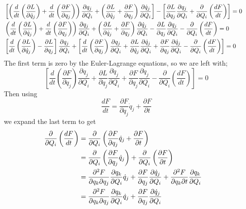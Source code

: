 \documentclass{article}
\begin{document}
\begin{align}
    &\left[ \left(\frac{d}{dt} \left( \frac{\partial L}{\partial \dot{q}_j} \right) + \frac{d}{dt} \left( \frac{\partial F}{\partial q_j} \right)\right) \frac{\partial q_j}{\partial Q_i} + \left(\frac{\partial L}{\partial \dot{q}_j} + \frac{\partial F}{\partial q_j}\right) \frac{\partial \dot{q}_j}{\partial Q_i} \right] - \left[ \frac{\partial L}{\partial q_j} \frac{\partial q_j}{\partial Q_i} + \frac{\partial}{\partial Q_i} \left( \frac{dF}{dt} \right) \right] = 0 \cr
    &\left(\frac{d}{dt} \left( \frac{\partial L}{\partial \dot{q}_j} \right) + \frac{d}{dt} \left( \frac{\partial F}{\partial q_j} \right)\right) \frac{\partial q_j}{\partial Q_i} + \left(\frac{\partial L}{\partial \dot{q}_j} + \frac{\partial F}{\partial q_j}\right) \frac{\partial \dot{q}_j}{\partial Q_i} - \frac{\partial L}{\partial q_j} \frac{\partial q_j}{\partial Q_i} - \frac{\partial}{\partial Q_i} \left( \frac{dF}{dt} \right) = 0 \cr
    &\left[ \frac{d}{dt} \left( \frac{\partial L}{\partial \dot{q}_j} \right) - \frac{\partial L}{\partial q_j} \right] \frac{\partial q_j}{\partial Q_i} + \left[ \frac{d}{dt} \left( \frac{\partial F}{\partial q_j} \right) \frac{\partial q_j}{\partial Q_i} + \frac{\partial L}{\partial \dot{q}_j} \frac{\partial \dot{q}_j}{\partial Q_i} + \frac{\partial F}{\partial q_j} \frac{\partial \dot{q}_j}{\partial Q_i} - \frac{\partial}{\partial Q_i} \left( \frac{dF}{dt} \right) \right] = 0
\end{align}
The first term is zero by the Euler-Lagrange equations, so we are left with;
\begin{equation}
	\left[ \frac{d}{dt} \left( \frac{\partial F}{\partial q_j} \right) \frac{\partial q_j}{\partial Q_i} + \frac{\partial L}{\partial \dot{q}_j} \frac{\partial \dot{q}_j}{\partial Q_i} + \frac{\partial F}{\partial q_j} \frac{\partial \dot{q}_j}{\partial Q_i} - \frac{\partial}{\partial Q_i} \left( \frac{dF}{dt} \right) \right] = 0
\end{equation}
Then using
\begin{equation}
	\frac{dF}{dt} = \frac{\partial F}{\partial q_j}\dot q_j + \frac{\partial F}{\partial t}
\end{equation}
we expand the last term to get
\begin{align}
	\frac{\partial}{\partial Q_i} \left( \frac{dF}{dt} \right) &= \frac{\partial}{\partial Q_i} \left( \frac{\partial F}{\partial q_j} \dot{q}_j + \frac{\partial F}{\partial t} \right) \cr
	&= \frac{\partial}{\partial Q_i} \left( \frac{\partial F}{\partial q_j} \dot{q}_j \right) + \frac{\partial}{\partial Q_i} \left( \frac{\partial F}{\partial t} \right) \cr
	&= \frac{\partial^2 F}{\partial q_k \partial q_j} \frac{\partial q_k}{\partial Q_i} \dot{q}_j + \frac{\partial F}{\partial q_j} \frac{\partial \dot{q}_j}{\partial Q_i} + \frac{\partial^2 F}{\partial q_k \partial t} \frac{\partial q_k}{\partial Q_i} \cr
	&= \frac{\partial^2 F}{\partial q_k \partial q_j} \frac{\partial q_k}{\partial Q_i} \dot{q}_j + \frac{\partial F}{\partial q_j} \frac{\partial \dot{q}_j}{\partial Q_i}
\end{align}
\end{document}
